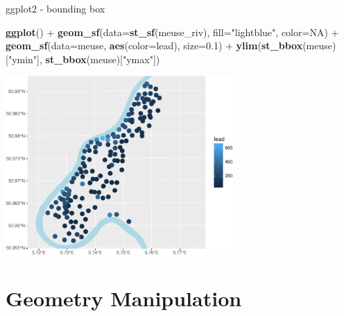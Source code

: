 \documentclass[11pt,ignorenonframetext,]{beamer}
\newenvironment{Shaded}{}{}
\newcommand{\KeywordTok}[1]{\textcolor[rgb]{0.00,0.44,0.13}{\textbf{#1}}}
\newcommand{\DataTypeTok}[1]{\textcolor[rgb]{0.56,0.13,0.00}{#1}}
\newcommand{\FloatTok}[1]{\textcolor[rgb]{0.25,0.63,0.44}{#1}}
\newcommand{\StringTok}[1]{\textcolor[rgb]{0.25,0.44,0.63}{#1}}
\newcommand{\OtherTok}[1]{\textcolor[rgb]{0.00,0.44,0.13}{#1}}
\newcommand{\OperatorTok}[1]{\textcolor[rgb]{0.40,0.40,0.40}{#1}}
\newcommand{\NormalTok}[1]{#1}
\let\oldShaded\Shaded
\let\endoldShaded\endShaded
\renewenvironment{Shaded}{\footnotesize\begin{spacing}{0.9}\oldShaded}{\endoldShaded\end{spacing}}
\let\oldverbatim\verbatim
\let\endoldverbatim\endverbatim
\newcommand{\scriptoutput}{
  \renewenvironment{Shaded}{\scriptsize\begin{spacing}{0.9}\oldShaded}{\endoldShaded\end{spacing}}
  \renewenvironment{verbatim}{\scriptsize\begin{spacing}{0.9}\oldverbatim}{\endoldverbatim\end{spacing}}
}
\begin{document}
\begin{frame}[fragile,t]{ggplot2 - bounding box}

\scriptoutput

\begin{Shaded}
\begin{Highlighting}[]
\KeywordTok{ggplot}\NormalTok{() }\OperatorTok{+}
\StringTok{  }\KeywordTok{geom_sf}\NormalTok{(}\DataTypeTok{data=}\KeywordTok{st_sf}\NormalTok{(meuse_riv), }\DataTypeTok{fill=}\StringTok{"lightblue"}\NormalTok{, }\DataTypeTok{color=}\OtherTok{NA}\NormalTok{) }\OperatorTok{+}
\StringTok{  }\KeywordTok{geom_sf}\NormalTok{(}\DataTypeTok{data=}\NormalTok{meuse, }\KeywordTok{aes}\NormalTok{(}\DataTypeTok{color=}\NormalTok{lead), }\DataTypeTok{size=}\FloatTok{0.1}\NormalTok{) }\OperatorTok{+}
\StringTok{  }\KeywordTok{ylim}\NormalTok{(}\KeywordTok{st_bbox}\NormalTok{(meuse)[}\StringTok{"ymin"}\NormalTok{], }\KeywordTok{st_bbox}\NormalTok{(meuse)[}\StringTok{"ymax"}\NormalTok{])}
\end{Highlighting}
\end{Shaded}

\begin{center}\includegraphics[width=0.65\textwidth]{Lec17_files/figure-beamer/unnamed-chunk-14-1} \end{center}

\end{frame}

\section{Geometry Manipulation}\label{geometry-manipulation}
\end{document}
